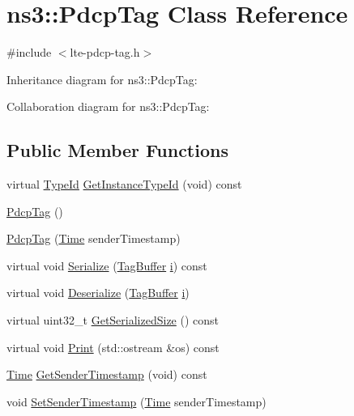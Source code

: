 \hypertarget{classns3_1_1PdcpTag}{}\section{ns3\+:\+:Pdcp\+Tag Class Reference}
\label{classns3_1_1PdcpTag}


{\ttfamily \#include $<$lte-\/pdcp-\/tag.\+h$>$}



Inheritance diagram for ns3\+:\+:Pdcp\+Tag\+:


Collaboration diagram for ns3\+:\+:Pdcp\+Tag\+:
\subsection*{Public Member Functions}
\begin{DoxyCompactItemize}
\item 
virtual \hyperlink{classns3_1_1TypeId}{Type\+Id} \hyperlink{classns3_1_1PdcpTag_a778c06208eec93caf9e335fcd62fe02f}{Get\+Instance\+Type\+Id} (void) const 
\item 
\hyperlink{classns3_1_1PdcpTag_afac032f5010c2f6c5d093ee4e84a8bee}{Pdcp\+Tag} ()
\item 
\hyperlink{classns3_1_1PdcpTag_a565d0124b28df7fbbb6850b182cc16ce}{Pdcp\+Tag} (\hyperlink{classns3_1_1Time}{Time} sender\+Timestamp)
\item 
virtual void \hyperlink{classns3_1_1PdcpTag_a0fad2a5aff62dc292909d9e9c22a1860}{Serialize} (\hyperlink{classns3_1_1TagBuffer}{Tag\+Buffer} \hyperlink{lte__uplink__power__control_8m_a6f6ccfcf58b31cb6412107d9d5281426}{i}) const 
\item 
virtual void \hyperlink{classns3_1_1PdcpTag_ad4da9d15f9c3bfffe445fa2670d90060}{Deserialize} (\hyperlink{classns3_1_1TagBuffer}{Tag\+Buffer} \hyperlink{lte__uplink__power__control_8m_a6f6ccfcf58b31cb6412107d9d5281426}{i})
\item 
virtual uint32\+\_\+t \hyperlink{classns3_1_1PdcpTag_ae20e83b67da9cc772086d5a7f485ac95}{Get\+Serialized\+Size} () const 
\item 
virtual void \hyperlink{classns3_1_1PdcpTag_a1afee56c36ccb6040181580c14e7ae22}{Print} (std\+::ostream \&os) const 
\item 
\hyperlink{classns3_1_1Time}{Time} \hyperlink{classns3_1_1PdcpTag_a2f40e81d8393d1c845bb02fd63e131c7}{Get\+Sender\+Timestamp} (void) const 
\item 
void \hyperlink{classns3_1_1PdcpTag_a08ddbf93fd116ebf4e0d610a758d3278}{Set\+Sender\+Timestamp} (\hyperlink{classns3_1_1Time}{Time} sender\+Timestamp)
\end{DoxyCompactItemize}

